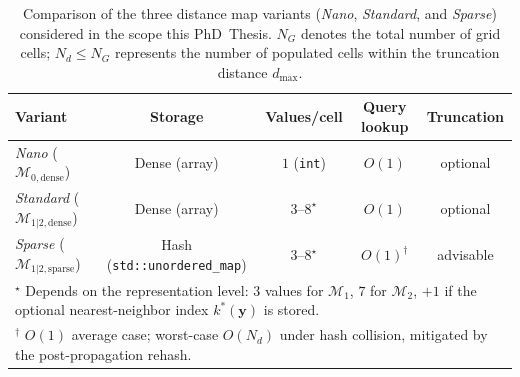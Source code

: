 \begin{table}[!t]
\centering
\caption[Comparison of the three distance map variants
         (\emph{Nano}, \emph{Standard}, and \emph{Sparse}) considered in the
         scope this PhD~Thesis]{Comparison of the three distance map variants
         (\emph{Nano}, \emph{Standard}, and \emph{Sparse}) considered in the
         scope this PhD~Thesis. $N_G$ denotes the total number of grid cells;
         $N_d \leq N_G$ represents the number of populated cells
         within the truncation distance $d_{\max}$.}
\label{tab:distance-maps:alignment:dmaps}
\begin{tabular}{lcccc}
\hline
\textbf{Variant} & \textbf{Storage} & \textbf{Values/cell} &
\textbf{Query lookup} & \textbf{Truncation} \\
\hline
\emph{Nano} ($\mathcal{M}_{0,\mathrm{dense}}$) &
    Dense (array) &
    $1$ (\texttt{int}) &
    $O(1)$ &
    optional \\
\emph{Standard} ($\mathcal{M}_{1|2,\mathrm{dense}}$) &
    Dense (array) &
    $3$--$8^{\star}$ &
    $O(1)$ &
    optional \\
\emph{Sparse} ($\mathcal{M}_{1|2,\mathrm{sparse}}$) &
    Hash (\texttt{std::unordered\_map}) &
    $3$--$8^{\star}$ &
    $O(1)^{\dagger}$ &
    advisable \\
\hline
\multicolumn{5}{l}{%
    \footnotesize
    $^{\star}$ Depends on the representation level:
    $3$ values for $\mathcal{M}_1$,
    $7$ for $\mathcal{M}_2$,
    $+1$ if the optional nearest-neighbor index $k^*(\mathbf{y})$ is stored.} \\
\multicolumn{5}{l}{%
    \footnotesize
    $^{\dagger}$ $O(1)$ average case; worst-case $O(N_d)$ under hash
    collision, mitigated by the post-propagation rehash.}\\
\end{tabular}
\end{table}
